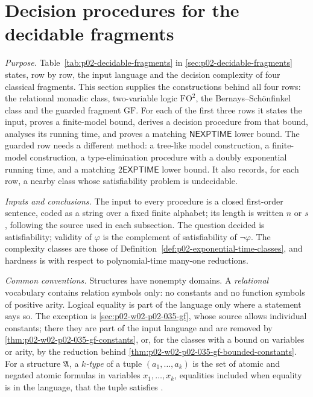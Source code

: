 \section{Decision procedures for the decidable fragments}
\label{sec:p02-w02-p02-035-decision-procedures}

\emph{Purpose.}  Table~\ref{tab:p02-decidable-fragments} in
\cref{sec:p02-decidable-fragments} states, row by row, the input language and
the decision complexity of four classical fragments.  This section supplies
the constructions behind all four rows: the relational monadic class,
two-variable logic \(\mathrm{FO}^2\), the Bernays--Sch\"onfinkel class and
the guarded fragment \(\mathrm{GF}\).  For each of the first three rows it
states the input, proves a finite-model bound, derives a decision procedure
from that bound, analyses its running time, and proves a matching
\(\mathsf{NEXPTIME}\) lower bound.  The guarded row needs a different method:
a tree-like model construction, a finite-model construction, a type-elimination
procedure with a doubly exponential running time, and a matching
\(2\mathsf{EXPTIME}\) lower bound.  It also records, for each row, a
nearby class whose satisfiability problem is undecidable.

\emph{Inputs and conclusions.}  The input to every procedure is a closed
first-order sentence, coded as a string over a fixed finite alphabet; its
length is written \(n\) or \(s\), following the source used in each
subsection.  The question decided is satisfiability; validity of
\(\varphi\) is the complement of satisfiability of \(\neg\varphi\).  The
complexity classes are those of
Definition~\ref{def:p02-exponential-time-classes}, and hardness is with
respect to polynomial-time many-one reductions.

\emph{Common conventions.}  Structures have nonempty domains.  A
\emph{relational} vocabulary contains relation symbols only: no constants and
no function symbols of positive arity.  Logical equality is part of the
language only where a statement says so.  The exception is
\cref{sec:p02-w02-p02-035-gf}, whose source allows individual constants; there
they are part of the input language and are removed by
\cref{thm:p02-w02-p02-035-gf-constants}, or, for the classes with a bound on
variables or arity, by the reduction behind
\cref{thm:p02-w02-p02-035-gf-bounded-constants}.  For a structure \(\mathfrak A\), a
\emph{\(k\)-type} of a tuple \((a_1,\ldots,a_k)\) is the set of atomic and
negated atomic formulas in variables \(x_1,\ldots,x_k\), equalities included
when equality is in the language, that the tuple satisfies
\cite[def.~4.1]{GradelKolaitisVardi1997}.

